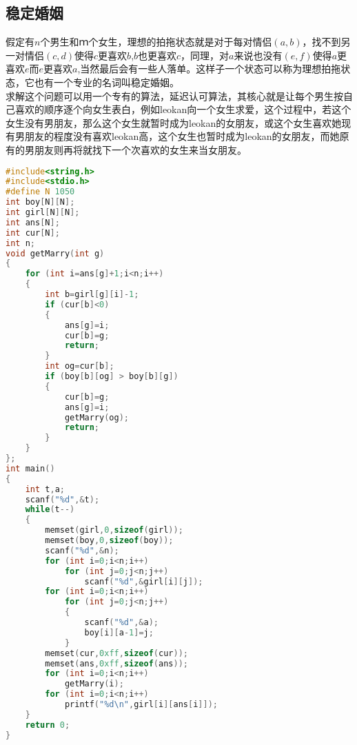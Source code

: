 \subsection{稳定婚姻}
    假定有$n$个男生和$ｍ$个女生，理想的拍拖状态就是对于每对情侣$(a,b)$，找不到另一对情侣$(c,d)$使得$c$更喜欢$b$,$b$也更喜欢$c$，同理，对$a$来说也没有$(e,f)$使得$a$更喜欢$e$而$e$更喜欢$a$,当然最后会有一些人落单。这样子一个状态可以称为理想拍拖状态，它也有一个专业的名词叫稳定婚姻。\\
    求解这个问题可以用一个专有的算法，延迟认可算法，其核心就是让每个男生按自己喜欢的顺序逐个向女生表白，例如leokan向一个女生求爱，这个过程中，若这个女生没有男朋友，那么这个女生就暂时成为leokan的女朋友，或这个女生喜欢她现有男朋友的程度没有喜欢leokan高，这个女生也暂时成为leokan的女朋友，而她原有的男朋友则再将就找下一个次喜欢的女生来当女朋友。
    \begin{lstlisting}[language=c++]
#include<string.h>
#include<stdio.h>
#define N 1050
int boy[N][N];
int girl[N][N];
int ans[N];
int cur[N];
int n;
void getMarry(int g)
{
	for (int i=ans[g]+1;i<n;i++)
	{
		int b=girl[g][i]-1;
		if (cur[b]<0)
		{
			ans[g]=i;
			cur[b]=g;
			return;
		}
		int og=cur[b];
		if (boy[b][og] > boy[b][g])
		{
			cur[b]=g;
			ans[g]=i;
			getMarry(og);
			return;
		}
	}
};
int main()
{
	int t,a;
	scanf("%d",&t);
	while(t--)
	{
		memset(girl,0,sizeof(girl));
		memset(boy,0,sizeof(boy));
		scanf("%d",&n);
		for (int i=0;i<n;i++)
			for (int j=0;j<n;j++)
				scanf("%d",&girl[i][j]);
		for (int i=0;i<n;i++)
			for (int j=0;j<n;j++)
			{
				scanf("%d",&a);
				boy[i][a-1]=j;
			}
		memset(cur,0xff,sizeof(cur));
		memset(ans,0xff,sizeof(ans));
		for (int i=0;i<n;i++)
			getMarry(i);
		for (int i=0;i<n;i++)
			printf("%d\n",girl[i][ans[i]]);
	}
	return 0;
}
    \end{lstlisting}